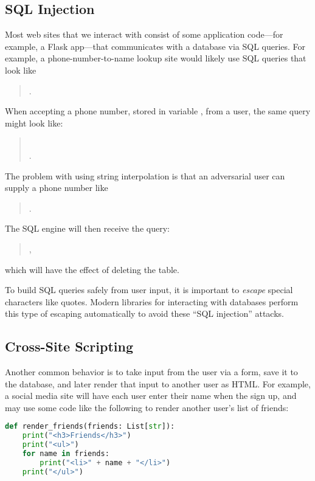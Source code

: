 \subsection{SQL Injection}
Most web sites that we interact with consist of some application code---for
example, a Flask app---that communicates with a database via SQL queries. For
example, a phone-number-to-name lookup site would likely use SQL queries that
look like 
\begin{quote}
	.
\end{quote}
When accepting a phone number, stored in variable , from a user,
the same query might look like:
\begin{quote}
	\\
	.
\end{quote}
The problem with using string interpolation is that an adversarial user
can supply a phone number like
\begin{quote}
	.
\end{quote}
The SQL engine will then receive the query:
\begin{quote}
	,
\end{quote}
which will have the effect of deleting the  table.

To build SQL queries safely from user input, it is important to \emph{escape}
special characters like quotes.
Modern libraries for interacting with databases perform this type of escaping
automatically to avoid these ``SQL injection'' attacks.


\subsection{Cross-Site Scripting}
Another common behavior is to take input from the user via a form, save it to the database, and later render that input to another user as HTML. For example, a social media site will have each user enter their name when the sign up, and may use some code like the following to render another user's list of friends:

\begin{lstlisting}[language=python]
def render_friends(friends: List[str]):
	print("<h3>Friends</h3>")
	print("<ul>")
	for name in friends:
		print("<li>" + name + "</li>")
	print("</ul>")
\end{lstlisting}

